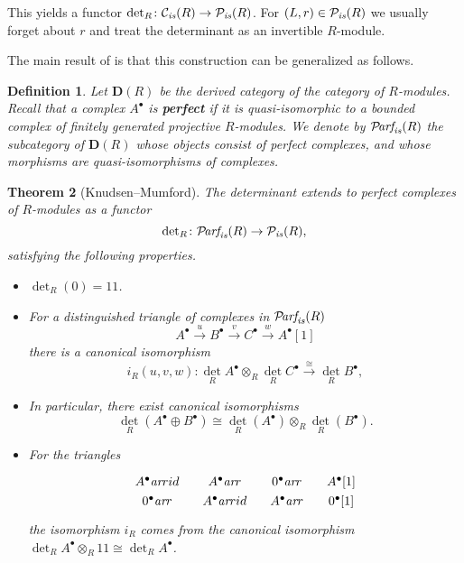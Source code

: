 \documentclass[10pt,a4paper,oneside,draft]{article}
\newcommand{\bone}{1\!\!1}
\newcommand{\Parf}{\mathcal{P}\!\text{\it arf}}
\renewcommand{\det}{\operatorname{det}}
\newcommand{\ar}{\text{\it ar}}
\newcommand{\is}{\text{\it is}}
\theoremstyle{myplain}
\newtheorem{theorem}{Theorem}[section]
\theoremstyle{mydefinition}
\newtheorem{definition}[theorem]{Definition}
\numberwithin{equation}{section}
\begin{document}
\begin{appendices}
This yields a functor
$\det_R\colon \mathcal{C}_\is (R) \to \mathcal{P}_\is (R)$.
For $(L,r) \in \mathcal{P}_\is (R)$ we usually forget about $r$ and treat the
determinant as an invertible $R$-module.

The main result of \cite[Chapter~I]{Knudsen-Mumford-1976} is that this
construction can be generalized as follows.

\begin{definition}
  Let $\mathbf{D} (R)$ be the derived category of the category of
  $R$-modules. Recall that a complex $A^\bullet$ is \textbf{perfect} if it is
  quasi-isomorphic to a bounded complex of finitely generated projective
  $R$-modules. We denote by $\Parf_\is (R)$ the subcategory of $\mathbf{D} (R)$
  whose objects consist of perfect complexes, and whose morphisms are
  quasi-isomorphisms of complexes.
\end{definition}

\begin{theorem}[Knudsen--Mumford]
  The determinant extends to perfect complexes of $R$-modules as a functor
  $$\det_R\colon \Parf_\is (R) \to \mathcal{P}_\is (R),$$
  satisfying the following properties.

  \begin{itemize}
  \item $\det_R (0) = \bone$.

  \item For a distinguished triangle of complexes in $\Parf_\is (R)$
    \[ A^\bullet \xrightarrow{u}
      B^\bullet \xrightarrow{v}
      C^\bullet \xrightarrow{w} A^\bullet [1] \]
    there is a canonical isomorphism
    \[ i_R (u,v,w)\colon \det_R A^\bullet \otimes_R \det_R C^\bullet
      \xrightarrow{\cong} \det_R B^\bullet, \]

  \item In particular, there exist canonical isomorphisms
    \[ \det_R (A^\bullet \oplus B^\bullet) \cong
      \det_R (A^\bullet) \otimes_R \det_R (B^\bullet). \]

  \item For the triangles
    \[ \begin{tikzcd}[column sep=1em]
        A^\bullet \ar{r}{id} & A^\bullet \ar{r} & 0^\bullet \ar{r} & A^\bullet [1] \\[-2em]
        0^\bullet \ar{r} & A^\bullet \ar{r}{id} & A^\bullet \ar{r} & 0^\bullet [1]
      \end{tikzcd} \]
    the isomorphism $i_R$ comes from the canonical isomorphism
    $\det_R A^\bullet \otimes_R \bone \cong \det_R A^\bullet$.


\end{itemize}
\end{theorem}
\end{appendices}
\end{document}

